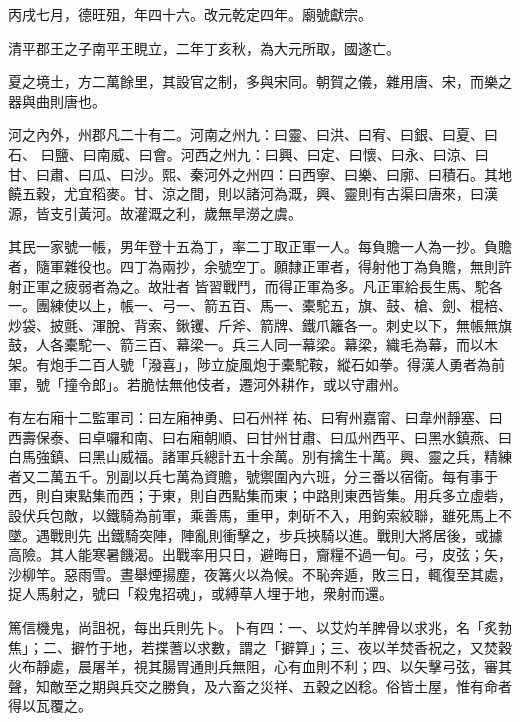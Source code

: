 \begin{pinyinscope}
 丙戌七月，德旺殂，年四十六。改元乾定四年。廟號獻宗。



 清平郡王之子南平王睍立，二年丁亥秋，為大元所取，國遂亡。



 夏之境土，方二萬餘里，其設官之制，多與宋同。朝賀之儀，雜用唐、宋，而樂之器與曲則唐也。



 河之內外，州郡凡二十有二。河南之州九：曰靈、曰洪、曰宥、曰銀、曰夏、曰石、
 曰鹽、曰南威、曰會。河西之州九：曰興、曰定、曰懷、曰永、曰涼、曰甘、曰肅、曰瓜、曰沙。熙、秦河外之州四：曰西寧、曰樂、曰廓、曰積石。其地饒五穀，尤宜稻麥。甘、涼之間，則以諸河為溉，興、靈則有古渠曰唐來，曰漢源，皆支引黃河。故灌溉之利，歲無旱澇之虞。



 其民一家號一帳，男年登十五為丁，率二丁取正軍一人。每負贍一人為一抄。負贍者，隨軍雜役也。四丁為兩抄，余號空丁。願隸正軍者，得射他丁為負贍，無則許射正軍之疲弱者為之。故壯者
 皆習戰鬥，而得正軍為多。凡正軍給長生馬、駝各一。團練使以上，帳一、弓一、箭五百、馬一、橐駝五，旗、鼓、槍、劍、棍棓、炒袋、披氈、渾脫、背索、鍬䦆、斤斧、箭牌、鐵爪籬各一。刺史以下，無帳無旗鼓，人各橐駝一、箭三百、幕梁一。兵三人同一幕梁。幕梁，織毛為幕，而以木架。有炮手二百人號「潑喜」，陟立旋風炮于橐駝鞍，縱石如拳。得漢人勇者為前軍，號「撞令郎」。若脆怯無他伎者，遷河外耕作，或以守肅州。



 有左右廂十二監軍司：曰左廂神勇、曰石州祥
 祐、曰宥州嘉甯、曰韋州靜塞、曰西壽保泰、曰卓囉和南、曰右廂朝順、曰甘州甘肅、曰瓜州西平、曰黑水鎮燕、曰白馬強鎮、曰黑山威福。諸軍兵總計五十余萬。別有擒生十萬。興、靈之兵，精練者又二萬五千。別副以兵七萬為資贍，號禦圍內六班，分三番以宿衛。每有事于西，則自東點集而西；于東，則自西點集而東；中路則東西皆集。用兵多立虛砦，設伏兵包敵，以鐵騎為前軍，乘善馬，重甲，刺斫不入，用鉤索絞聯，雖死馬上不墜。遇戰則先
 出鐵騎突陣，陣亂則衝擊之，步兵挾騎以進。戰則大將居後，或據高險。其人能寒暑饑渴。出戰率用只日，避晦日，齎糧不過一旬。弓，皮弦；矢，沙柳竿。惡雨雪。晝舉煙揚塵，夜篝火以為候。不恥奔遁，敗三日，輒復至其處，捉人馬射之，號曰「殺鬼招魂」，或縛草人埋于地，衆射而還。



 篤信機鬼，尚詛祝，每出兵則先卜。卜有四：一、以艾灼羊脾骨以求兆，名「炙勃焦」；二、擗竹于地，若揲蓍以求數，謂之「擗算」；三、夜以羊焚香祝之，又焚穀
 火布靜處，晨屠羊，視其腸胃通則兵無阻，心有血則不利；四、以矢擊弓弦，審其聲，知敵至之期與兵交之勝負，及六畜之災祥、五穀之凶稔。俗皆土屋，惟有命者得以瓦覆之。




\end{pinyinscope}
